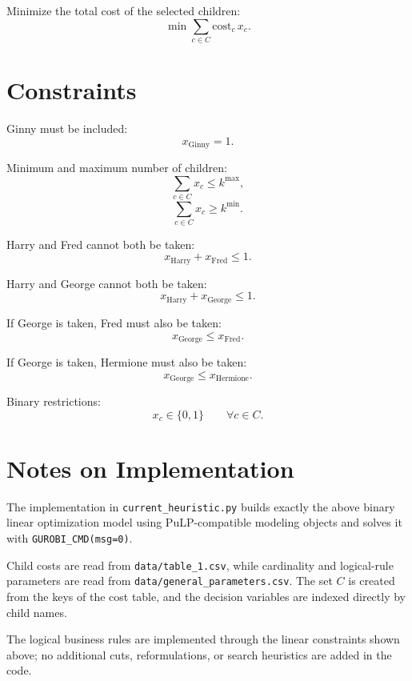 Minimize the total cost of the selected children:
\[
\min \sum_{c \in C} \mathrm{cost}_c\, x_c.
\]

\section*{Constraints}

Ginny must be included:
\[
x_{\text{Ginny}} = 1.
\]

Minimum and maximum number of children:
\[
\sum_{c \in C} x_c \le k^{\max},
\]
\[
\sum_{c \in C} x_c \ge k^{\min}.
\]

Harry and Fred cannot both be taken:
\[
x_{\text{Harry}} + x_{\text{Fred}} \le 1.
\]

Harry and George cannot both be taken:
\[
x_{\text{Harry}} + x_{\text{George}} \le 1.
\]

If George is taken, Fred must also be taken:
\[
x_{\text{George}} \le x_{\text{Fred}}.
\]

If George is taken, Hermione must also be taken:
\[
x_{\text{George}} \le x_{\text{Hermione}}.
\]

Binary restrictions:
\[
x_c \in \{0,1\} \qquad \forall c \in C.
\]

\section*{Notes on Implementation}

The implementation in \texttt{current\_heuristic.py} builds exactly the above binary linear optimization model using PuLP-compatible modeling objects and solves it with \texttt{GUROBI\_CMD(msg=0)}.

Child costs are read from \texttt{data/table\_1.csv}, while cardinality and logical-rule parameters are read from \texttt{data/general\_parameters.csv}. The set $C$ is created from the keys of the cost table, and the decision variables are indexed directly by child names.

The logical business rules are implemented through the linear constraints shown above; no additional cuts, reformulations, or search heuristics are added in the code.
